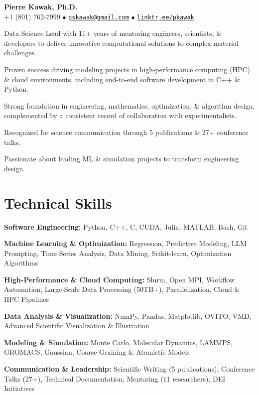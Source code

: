 \begin{center}
  {\LARGE \textbf{Pierre Kawak, Ph.D.} }\\[1ex]
  +1 (801) 762-7999 $\bullet$ \href{mailto:pskawak@gmail.com}{\tt pskawak@gmail.com} $\bullet$ \href{https://linktr.ee/pkawak}{\tt linktr.ee/pkawak}\\
\end{center}
\begin{tabitemize}
  \item Data Science Lead with 11+ years of mentoring engineers, scientists, \& developers to deliver innovative computational solutions to complex material challenges.
  \item Proven success driving modeling projects in high-performance computing (HPC) \& cloud environments, including end-to-end software development in C++ \& Python.
  \item Strong foundation in engineering, mathematics, optimization, \& algorithm design, complemented by a consistent record of collaboration with experimentalists.
  \item Recognized for science communication through 5 publications \& 27+ conference talks.
  \item Passionate about leading ML \& simulation projects to transform engineering design.
\end{tabitemize}
\vspace{-1.7\baselineskip}
\section*{Technical Skills}
\begin{tabitemize}
  \item \textbf{Software Engineering:} Python, C++, C, CUDA, Julia, MATLAB, Bash, Git
  \item \textbf{Machine Learning \& Optimization:} Regression, Predictive Modeling, LLM Prompting, Time Series Analysis, Data Mining, Scikit-learn, Optimization Algorithms
  \item \textbf{High-Performance \& Cloud Computing:} Slurm, Open MPI, Workflow Automation, Large-Scale Data Processing (50TB+), Parallelization, Cloud \& HPC Pipelines
  \item \textbf{Data Analysis \& Visualization:} NumPy, Pandas, Matplotlib, OVITO, VMD, Advanced Scientific Visualization \& Illustration
  \item \textbf{Modeling \& Simulation:} Monte Carlo, Molecular Dynamics, LAMMPS, GROMACS, Gaussian, Coarse-Graining \& Atomistic Models
  \item \textbf{Communication \& Leadership:} Scientific Writing (5 publications), Conference Talks (27+), Technical Documentation, Mentoring (11 researchers), DEI Initiatives
\end{tabitemize}
\vspace{-1.7\baselineskip}
